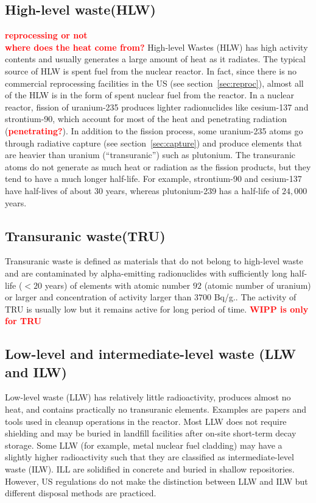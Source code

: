 \documentclass[preprint,aip,pra]{revtex4-1}
\newcommand{\red}[1]{\textcolor{red}{\bf #1}}
\begin{document}
    \subsection{High-level waste(HLW)}
    \red{reprocessing or not}\\
    \red{where does the heat come from?}
    High-level Wastes (HLW) has high activity contents and usually generates a large amount of
    heat as it radiates. The typical source of HLW is spent fuel from the nuclear reactor.
    In fact, since there is no commercial reprocessing facilities in the US (see section~\ref{sec:reproc}),
    almost all of the HLW is in the form of spent nuclear fuel from the reactor. In a nuclear reactor,
    fission of uranium-235 produces lighter radionuclides like cesium-137 and strontium-90, which
    account for most of the heat and penetrating radiation (\red{penetrating?}). In addition to
    the fission process, some uranium-235 atoms go through radiative capture
    (see section~\ref{sec:capture}) and produce elements that are
    heavier than uranium (``transuranic'') such as plutonium. The transuranic atoms do not generate
    as much heat or radiation as the fission products, but they tend to have a much longer half-life.
    For example, strontium-90 and cesium-137 have half-lives of about $30$ years, whereas
    plutonium-239 has a half-life of $24,000$ years.

    \subsection{Transuranic waste(TRU)}
    Transuranic waste is defined as materials that do not belong to high-level waste and are
    contaminated by alpha-emitting radionuclides with
    sufficiently long half-life ($<20$ years) of elements with atomic number $92$ (atomic number of uranium)
    or larger and concentration of activity larger than $3700$ Bq/g.\cite{j83,s01}. The activity
    of TRU is usually low but it remains active for long period of time.
    \red{WIPP is only for TRU}

    \subsection{Low-level and intermediate-level waste (LLW and ILW)}
    Low-level waste (LLW) has relatively little radioactivity, produces almost no heat,
    and contains practically no
    transuranic elements. Examples are papers and tools used in cleanup operations in the reactor.
    Most LLW does not require shielding and may be buried in landfill 
    facilities after on-site short-term decay storage.
    Some LLW (for example, metal nuclear fuel cladding) may have a slightly
    higher radioactivity such that they are classified
    as intermediate-level waste (ILW). ILL are solidified in concrete and buried in shallow
    repositories.\cite{s01} However, US regulations do not make the distinction
    between LLW and ILW but different disposal methods are practiced.\cite{nrc09, s01}
\end{document}
